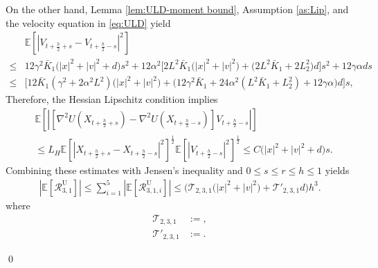 \documentclass[12pt]{article}
\newenvironment{redtext}
  {\color{black}\ignorespaces}
  {\ignorespacesafterend}
\numberwithin{equation}{section}
\renewenvironment{proof}%
  {\begin{trivlist}%
   \item[]\ignorespaces}%
  {\qed\end{trivlist}}
\newcommand{\E}{\mathbb{E}}
\begin{document}
\begin{redtext}
\begin{proof}
On the other hand,  Lemma \ref{lem:ULD-moment bound}, Assumption \ref{as:Lip}, and the velocity equation in \eqref{eq:ULD} yield
\begin{align}
&\E\left[
\left|
V_{t+\frac h2+s}
-
V_{t+\frac h2-s}
\right|^2
\right]
\nonumber \\
\leq &
12\gamma^2\bar K_1
\bigl(|x|^2+|v|^2+d\bigr)s^2
+
12\alpha^2
\Big[
2L^2\bar K_1
\bigl(|x|^2+|v|^2\bigr)
+
\bigl(2L^2\bar K_1+2L_2^2\bigr)d
\Big]s^2
+
12\gamma\alpha d s 
\nonumber \\
\leq &
\Big[
12\bar K_1(\gamma^2+2\alpha^2L^2)
\bigl(|x|^2+|v|^2\bigr)
+
\bigl(
12\gamma^2\bar K_1
+
24\alpha^2(L^2\bar K_1+L_2^2)
+
12\gamma\alpha
\bigr)d
\Big]s,
\label{eq:R3-mid-V-diff}
\end{align}
Therefore, the Hessian Lipschitz condition implies
\begin{equation}
\begin{aligned}
&\E\left[
\left|
\left[
\nabla^2U(X_{t+\frac h2+s})-\nabla^2U(X_{t+\frac h2-s})
\right]V_{t+\frac h2-s}
\right|
\right]
\\
&\leq
L_H
\E\left[\left|X_{t+\frac h2+s}-X_{t+\frac h2-s}\right|^2\right]^{\frac12}
\E\left[|V_{t+\frac h2-s}|^2\right]^{\frac12}
\leq
C\bigl(|x|^2+|v|^2+d\bigr)s.
\end{aligned}
\end{equation}
Combining these estimates with Jensen's inequality and $0\leq s \leq r \leq h \leq 1$ yields
\begin{equation}\label{eq:R3-mid-first-weak}
\begin{aligned}
|\E[\mathcal R^{\mathrm{U}}_{3,1}]|
\leq
\sum_{i=1}^5|\E[\mathcal R^{\mathrm{U}}_{3,1,i}]|
\leq  \Big( \mathcal T_{2,3,1}\bigl(|x|^2+|v|^2\bigr)+
\mathcal T'_{2,3,1}d\Big)h^3.
\end{aligned}
\end{equation}
where
\begin{align}
\mathcal T_{2,3,1}
&:= ,\\
\mathcal T'_{2,3,1}
&:=.
\end{align}


\end{proof}
\end{redtext}
\end{document}
